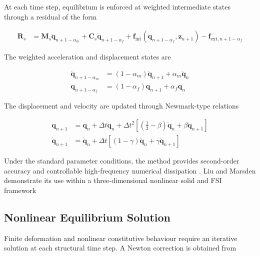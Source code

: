 At each time step, equilibrium is enforced at weighted intermediate states through a residual of the form

\begin{align}
\bm{R}_{s}
&=
\bm{M}_{s}\ddot{\bm{q}}_{n+1-\alpha_{m}}
+
\bm{C}_{s}\dot{\bm{q}}_{n+1-\alpha_{f}}
+
\bm{f}_{\mathrm{int}}\!\left(\bm{q}_{n+1-\alpha_{f}},\bm{z}_{n+1}\right)
-
\bm{f}_{\mathrm{ext},n+1-\alpha_{f}}
\label{eq:res_str_sim_generalised_alpha_residual}
\end{align}

The weighted acceleration and displacement states are

\begin{align}
\ddot{\bm{q}}_{n+1-\alpha_{m}}
&=
\left(1-\alpha_{m}\right)\ddot{\bm{q}}_{n+1}
+
\alpha_{m}\ddot{\bm{q}}_{n}
\label{eq:res_str_sim_weighted_acceleration}
\\
\bm{q}_{n+1-\alpha_{f}}
&=
\left(1-\alpha_{f}\right)\bm{q}_{n+1}
+
\alpha_{f}\bm{q}_{n}
\label{eq:res_str_sim_weighted_displacement}
\end{align}

The displacement and velocity are updated through Newmark-type relations

\begin{align}
\bm{q}_{n+1}
&=
\bm{q}_{n}
+
\Delta t\dot{\bm{q}}_{n}
+
\Delta t^{2}
\left[
\left(\frac{1}{2}-\beta\right)\ddot{\bm{q}}_{n}
+
\beta\ddot{\bm{q}}_{n+1}
\right]
\label{eq:res_str_sim_generalised_alpha_displacement_update}
\\
\dot{\bm{q}}_{n+1}
&=
\dot{\bm{q}}_{n}
+
\Delta t
\left[
\left(1-\gamma\right)\ddot{\bm{q}}_{n}
+
\gamma\ddot{\bm{q}}_{n+1}
\right]
\label{eq:res_str_sim_generalised_alpha_velocity_update}
\end{align}

Under the standard parameter conditions, the method provides second-order accuracy and controllable high-frequency numerical dissipation \autocite{chung1993}. Liu and Marsden demonstrate its use within a three-dimensional nonlinear solid and FSI framework \autocite{liu2018}

\subsection{Nonlinear Equilibrium Solution}
\label{subsec:res_str_sim_nonlinear_equilibrium_solution}

Finite deformation and nonlinear constitutive behaviour require an iterative solution at each structural time step. A Newton correction is obtained from

